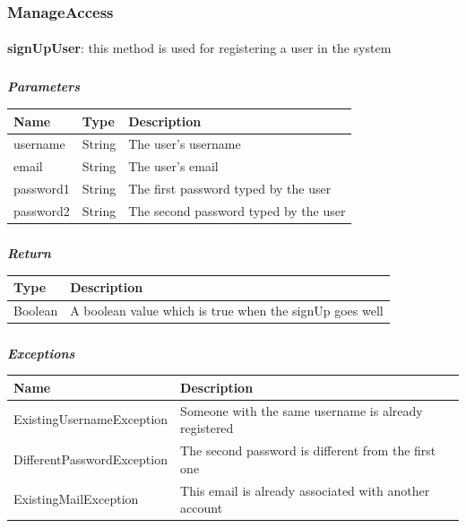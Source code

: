 				\subsubsection{ManageAccess}
					\paragraph{}
							\textbf{signUpUser}: this method is used for registering a user in the system
							\subparagraph{}
							\vspace{-3mm}
							\textcolor{myBlue}{\textit{\textbf{Parameters}}}
							\vspace{-2mm}
								\begin{table}[!h]
									\begin{tabular}{L{0.2\textwidth}L{0.15\textwidth}L{0.43\textwidth}}
										\toprule
										\textbf{Name} & \textbf{Type} & \textbf{Description} \\
										\midrule
								  		username & String & The user's username \\
								  		email & String & The user's email \\
								  		password1 & String & The first password typed by the user \\
								  		password2 & String & The second password typed by the user \\
								 		\bottomrule
									\end{tabular}
								\end{table}
							\subparagraph{}
							\vspace{-7mm}
								\textcolor{myGreen}{\textit{\textbf{Return}}}
								\vspace{-2mm}
									\begin{table}[!h]
									\begin{tabular}{L{0.15\textwidth}L{0.77\textwidth}}
										\toprule
										\textbf{Type} & \textbf{Description} \\
										\midrule
								  		Boolean & A boolean value which is true when the signUp goes well \\
								 		\bottomrule
									\end{tabular}
								\end{table}
							\subparagraph{}
							\vspace{-7mm}
								\textcolor{myRed}{\textit{\textbf{Exceptions}}}
								\vspace{-2mm}
									\begin{table}[!h]
									\begin{tabular}{L{0.4\textwidth}L{0.52\textwidth}}
										\toprule
										\textbf{Name} & \textbf{Description} \\
										\midrule
								  		ExistingUsernameException & Someone with the same username is already registered \\
								  		DifferentPasswordException & The second password is different from the first one \\
								  		ExistingMailException & This email is already associated with another account \\
								 		\bottomrule
									\end{tabular}
								\end{table}
							
